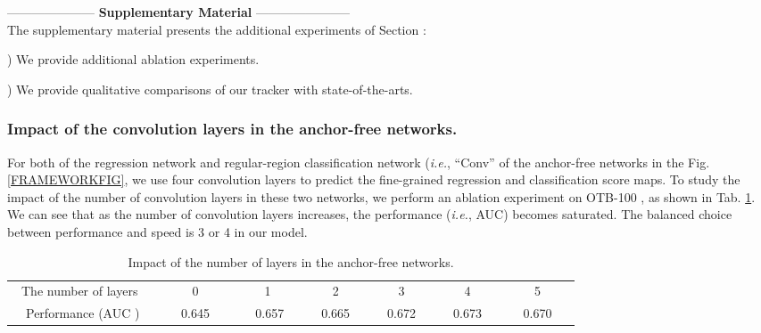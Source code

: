 \documentclass[runningheads]{llncs}
\begin{document}
\clearpage




\clearpage


 --------------------- {\large \textbf{Supplementary Material}} -----------------------
\\

\noindent The supplementary material presents the additional experiments of Section :

) We provide additional ablation experiments. 

) We provide qualitative comparisons of our tracker with state-of-the-arts.


\subsubsection{Impact of the convolution layers in the anchor-free networks.} For both of the regression network and regular-region classification network (\emph{i.e.}, ``Conv'' of the anchor-free networks in the Fig. \ref{FRAMEWORKFIG}, we use four convolution layers to predict the fine-grained regression and classification score maps.
To study the impact of the number of convolution layers in these two networks,  we perform an ablation experiment on OTB-100 \cite{OTB-2015}, as shown in Tab. \ref{LAYTAB}. We can see that as the number of convolution layers increases, the performance (\emph{i.e.}, AUC) becomes saturated. The balanced choice between performance and speed is 3 or 4 in our model. 

\begin{table}
	\centering
	\vspace{-1em}
	\fontsize{9pt}{4mm}\selectfont
	\begin{threeparttable}
		\begin{tabular}{ @{}c@{} | @{}c@{} @{}c@{} @{}c@{} @{}c@{} @{}c@{} @{}c@{}}
			
			The number of layers~& ~~~0~~~ & ~~~1~~~ & ~~~2~~~ & ~~~3~~~ & ~~~4~~~ & ~~~5~~~
			\\  \cline{1-7}
			~~Performance (AUC )~~ &~~ 0.645 ~~&~~ 0.657~~ & ~~0.665~~ & ~~0.672~~  & ~~0.673~~ & ~~ 0.670 ~~
		\end{tabular}
	\end{threeparttable}
	\vspace{0.5em}
	\caption{Impact of the number of layers in the anchor-free networks.}
	\vspace{-2.5em}
	\label{LAYTAB}
\end{table}
\end{document}
